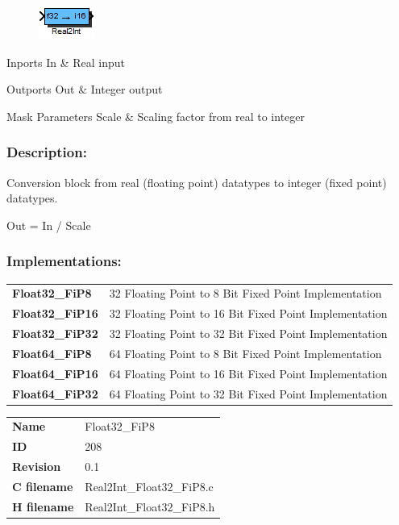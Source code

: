 \label{block:Real2Int}
\begin{figure}[H]\includegraphics{Real2Int}\end{figure} 

\begin{XtoCtabular}{Inports}
In & Real input\tabularnewline
\hline
\end{XtoCtabular}


\begin{XtoCtabular}{Outports}
Out & Integer output\tabularnewline
\hline
\end{XtoCtabular}

\begin{XtoCtabular}{Mask Parameters}
Scale & Scaling factor from real to integer\tabularnewline
\hline
\end{XtoCtabular}

\subsubsection*{Description:}
Conversion block from real (floating point) datatypes to integer (fixed point) datatypes.

  Out = In / Scale 


\subsubsection*{Implementations:}
\begin{tabular}{l l}
\textbf{Float32\_FiP8} & 32 Floating Point to 8 Bit Fixed Point Implementation\tabularnewline
\textbf{Float32\_FiP16} & 32 Floating Point to 16 Bit Fixed Point Implementation\tabularnewline
\textbf{Float32\_FiP32} & 32 Floating Point to 32 Bit Fixed Point Implementation\tabularnewline
\textbf{Float64\_FiP8} & 64 Floating Point to 8 Bit Fixed Point Implementation\tabularnewline
\textbf{Float64\_FiP16} & 64 Floating Point to 16 Bit Fixed Point Implementation\tabularnewline
\textbf{Float64\_FiP32} & 64 Floating Point to 32 Bit Fixed Point Implementation\tabularnewline
\end{tabular}

\nopagebreak[0]
\begin{tabular}{l l}
\textbf{Name} & Float32\_FiP8 \tabularnewline
\textbf{ID} & 208 \tabularnewline
\textbf{Revision} & 0.1 \tabularnewline
\textbf{C filename} & Real2Int\_Float32\_FiP8.c \tabularnewline
\textbf{H filename} & Real2Int\_Float32\_FiP8.h \tabularnewline
\end{tabular}
\vspace{1ex}

